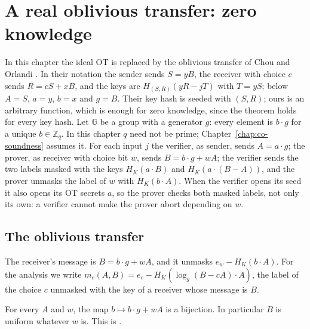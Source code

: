 \chapter{A real oblivious transfer: zero knowledge}
\label{chap:ot}

In this chapter the ideal OT is replaced by the oblivious transfer of Chou and Orlandi
\cite[Sect.~2.1]{CO15}. In their notation the sender sends $S = yB$, the receiver with choice $c$
sends $R = cS + xB$, and the keys are $H_{(S,R)}(yR - jT)$ with $T = yS$; below $A = S$, $a = y$,
$b = x$ and $g = B$. Their key hash is seeded with $(S, R)$; ours is an arbitrary function, which
is enough for zero knowledge, since the theorem holds for every key hash.
Let $\mathbb{G}$ be a group with a generator $g$: every element is $b \cdot g$ for a unique
$b \in \mathbb{Z}_q$. In this chapter $q$ need not be prime; Chapter~\ref{chap:co-soundness}
assumes it. For each input $j$ the verifier, as sender, sends $A = a \cdot g$; the prover,
as receiver with choice bit $w$, sends $B = b \cdot g + wA$; the verifier sends the two labels
masked with the keys $H_K(a \cdot B)$ and $H_K(a \cdot (B - A))$, and the prover unmasks the label
of $w$ with $H_K(b \cdot A)$. When the verifier opens its seed it also opens its OT secrets $a$, so
the prover checks both masked labels, not only its own: a verifier cannot make the prover abort
depending on $w$.

\section{The oblivious transfer}

\begin{definition}
  \label{def:co-ot}
  \leanok
  The receiver's message is $B = b \cdot g + wA$, and it unmasks $e_w - H_K(b \cdot A)$. For the
  analysis we write $m_c(A, B) = e_c - H_K(\log_g(B - cA) \cdot A)$, the label of the choice $c$
  unmasked with the key of a receiver whose message is $B$.
\end{definition}

\begin{lemma}
  \label{lem:rmsg-bij}
  \leanok
  For every $A$ and $w$, the map $b \mapsto b \cdot g + wA$ is a bijection. In particular $B$ is
  uniform whatever $w$ is. This is \cite[Lemma~1]{CO15}.
\end{lemma}

